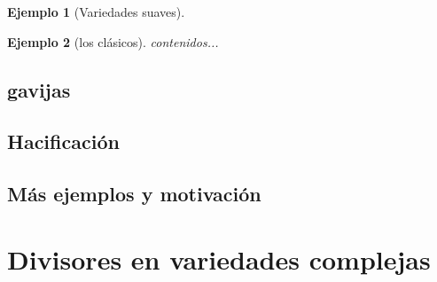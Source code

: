 \documentclass[12pt]{book}
\newtheorem{eje}{Ejemplo}
\begin{document}
\begin{eje}[Variedades suaves]

\end{eje}

\begin{eje}[los clásicos]
	contenidos...
\end{eje}

\subsection{gavijas}


\subsection{Hacificación}

%
%
%
%
%
%



\subsection{Más ejemplos y motivación}






\section{Divisores en variedades complejas}

\end{document}
